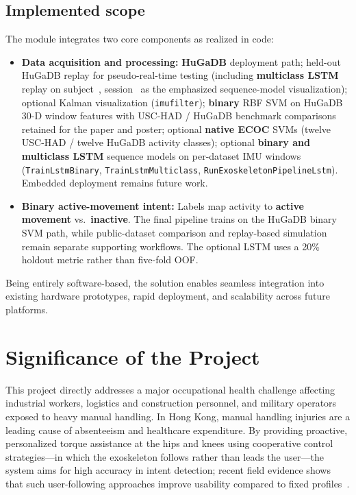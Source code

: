 \documentclass[12pt,a4paper]{report}
\begin{document}
\subsection*{Implemented scope}
The module integrates two core components as realized in code:
\begin{itemize}
  \item \textbf{Data acquisition and processing:} \textbf{HuGaDB} deployment path; held-out HuGaDB replay for pseudo-real-time testing (including \textbf{multiclass LSTM} replay on subject~\ReplayHuGaDBSubject{}, session~\ReplayHuGaDBSession{} as the emphasized sequence-model visualization); optional Kalman visualization (\texttt{imufilter}); \textbf{binary} RBF SVM on HuGaDB 30-D window features with USC-HAD / HuGaDB benchmark comparisons retained for the paper and poster; optional \textbf{native ECOC} SVMs (twelve USC-HAD / twelve HuGaDB activity classes); optional \textbf{binary and multiclass LSTM} sequence models on per-dataset IMU windows (\texttt{TrainLstmBinary}, \texttt{TrainLstmMulticlass}, \texttt{RunExoskeletonPipelineLstm}). Embedded deployment remains future work.
  \item \textbf{Binary active-movement intent:} Labels map activity to \textbf{active movement} vs.\ \textbf{inactive}. The final pipeline trains on the HuGaDB binary SVM path, while public-dataset comparison and replay-based simulation remain separate supporting workflows. The optional LSTM uses a 20\% holdout metric rather than five-fold OOF.
\end{itemize}

Being entirely software-based, the solution enables seamless integration into existing hardware prototypes, rapid deployment, and scalability across future platforms.

\section{Significance of the Project}
This project directly addresses a major occupational health challenge affecting industrial workers, logistics and construction personnel, and military operators exposed to heavy manual handling. In Hong Kong, manual handling injuries are a leading cause of absenteeism and healthcare expenditure. By providing proactive, personalized torque assistance at the hips and knees using cooperative control strategies---in which the exoskeleton follows rather than leads the user---the system aims for high accuracy in intent detection; recent field evidence shows that such user-following approaches improve usability compared to fixed profiles~\cite{le2024}.
\end{document}
